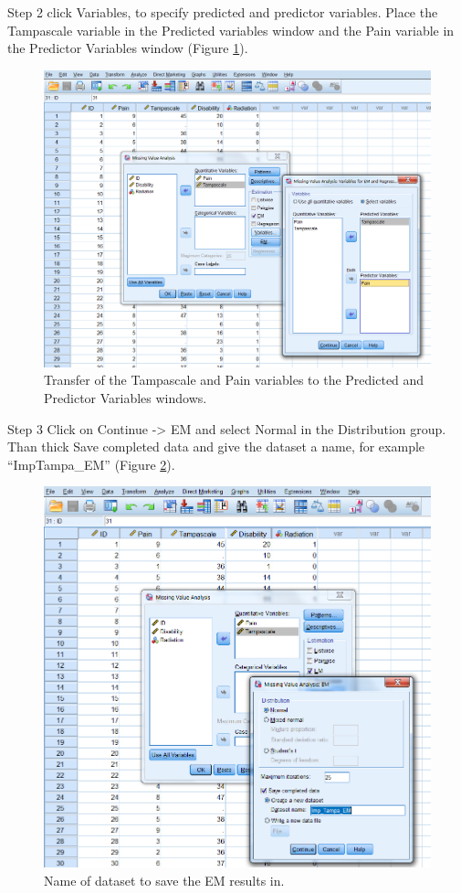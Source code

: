 \documentclass[
]{book}
\begin{document}
Step 2
click Variables, to specify predicted and predictor variables. Place the Tampascale variable in the Predicted variables window and the Pain variable in the Predictor Variables window (Figure \ref{fig:fig3-11}).

\begin{figure}

{\centering \includegraphics[width=0.7\linewidth]{images/fig3.11} 

}

\caption{Transfer of the Tampascale and Pain variables to the Predicted and Predictor Variables windows.}\label{fig:fig3-11}
\end{figure}

Step 3
Click on Continue -\textgreater{} EM and select Normal in the Distribution group. Than thick Save completed data and give the dataset a name, for example ``ImpTampa\_EM'' (Figure \ref{fig:fig3-12}).

\begin{figure}

{\centering \includegraphics[width=0.7\linewidth]{images/fig3.12} 

}

\caption{Name of dataset to save the EM results in.}\label{fig:fig3-12}
\end{figure}
\end{document}
